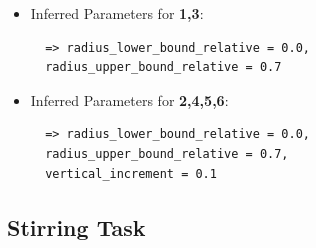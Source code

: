 \begin{itemize}
\item Inferred Parameters for \textbf{1,3}: 
 \begin{lstlisting}
  => radius_lower_bound_relative = 0.0, 
  radius_upper_bound_relative = 0.7
\end{lstlisting}
\item Inferred Parameters for \textbf{2,4,5,6}:
\begin{lstlisting}
  => radius_lower_bound_relative = 0.0, 
  radius_upper_bound_relative = 0.7,
  vertical_increment = 0.1
\end{lstlisting}
\end{itemize}

\subsection*{Stirring Task}

